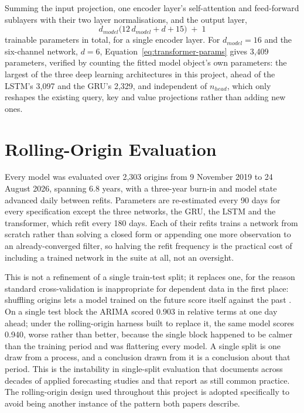 \documentclass[12pt,a4paper]{report}
\begin{document}
Summing the input projection, one encoder layer's self-attention and
feed-forward sublayers with their two layer normalisations, and the output
layer,
\begin{equation}
d_{model}\big(12\,d_{model} + d + 15\big) \;+\; 1
\label{eq:transformer-params}
\end{equation}
trainable parameters in total, for a single encoder layer. For $d_{model}=16$
and the six-channel network, $d=6$, Equation~\ref{eq:transformer-params}
gives 3{,}409 parameters, verified by counting the fitted model
object's own parameters: the largest of the three deep learning
architectures in this project, ahead of the LSTM's 3{,}097 and the GRU's
2{,}329, and independent of $n_{head}$, which only reshapes the existing
query, key and value projections rather than adding new ones.

\begin{table}[htbp]
\centering
\caption{The four neural architectures' specifications, consolidated.
Each number is individually stated in its own subsection above; this is
the same numbers read side by side rather than four subsections apart.}
\label{tab:architectures}

\end{table}

\section{Rolling-Origin Evaluation}
\label{sec:rolling}

Every model was evaluated over 2{,}303 origins from 9 November 2019 to 24 August
2026, spanning 6.8 years, with a three-year burn-in and model state advanced
daily between refits. Parameters are re-estimated every 90 days for every
specification except the three networks, the GRU, the LSTM and the
transformer, which refit every 180 days. Each of their refits trains a
network from scratch rather than solving a closed form or appending one more
observation to an already-converged filter, so halving the refit frequency
is the practical cost of including a trained network in the suite at all,
not an oversight.

This is not a refinement of a single train-test split; it replaces one, for the
reason standard cross-validation is inappropriate for dependent data in the
first place: shuffling origins lets a model trained on the future score itself
against the past \citep{bergmeir2012crossvalidation}. On a single test block the
ARIMA scored 0.903 in relative terms at one day ahead; under the rolling-origin
harness built to replace it, the same model scores 0.940, worse rather than
better, because the single block happened to be calmer than the training
period and was flattering every model. A single split is one draw from a
process, and a conclusion drawn from it is a conclusion about that period.
This is the instability in single-split evaluation that \citet{tashman2000outofsample}
documents across decades of applied forecasting studies and that
\citet{hewamalage2023evaluation} report as still common practice. The
rolling-origin design used throughout this project is adopted specifically
to avoid being another instance of the pattern both papers describe.
\end{document}
